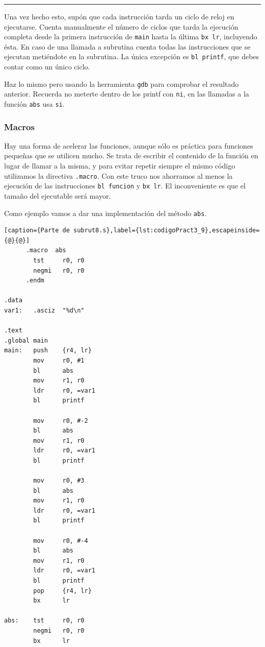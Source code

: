 \begin{center}
\begin{myfbox}
\small
\begin{minipage}{0.92\linewidth}
\begin{center}
\colorbox[gray]{1}{\rule{0cm}{4.5cm}\rule{11cm}{0cm}}
\end{center}
\end{minipage}
\end{myfbox}
\end{center}

Una vez hecho esto, supón que cada instrucción tarda un ciclo de reloj en ejecutarse.
Cuenta manualmente el número de ciclos que tarda la ejecución completa desde la primera
instrucción de {\tt main} hasta la última {\tt bx lr}, incluyendo ésta. En caso de una
llamada a subrutina cuenta todas las instrucciones que se ejecutan metiéndote en la
subrutina. La única excepción es {\tt bl printf}, que debes contar como un único ciclo.

Haz lo mismo pero usando la herramienta {\tt gdb} para comprobar el resultado anterior.
Recuerda no meterte dentro de los printf con {\tt ni}, en las llamadas a la función
{\tt abs} usa {\tt si}.

\subsubsection{Macros}

Hay una forma de acelerar las funciones, aunque sólo es práctica para funciones pequeñas
que se utilicen mucho. Se trata de escribir el contenido de la función en lugar de
llamar a la misma, y para evitar repetir siempre el mismo código utilizamos la directiva
{\tt .macro}. Con este truco nos ahorramos al menos la ejecución de las instrucciones
{\tt bl funcion} y {\tt bx lr}. El inconveniente es que el tamaño del ejecutable será
mayor.

Como ejemplo vamos a dar una implementación del método {\tt abs}.

\begin{lstlisting}[caption={Parte de subrut8.s},label={lst:codigoPract3_9},escapeinside={@}{@}]
      .macro  abs
        tst     r0, r0
        negmi   r0, r0
      .endm

.data
var1:   .asciz  "%d\n"

.text
.global main
main:   push    {r4, lr}
        mov     r0, #1
        bl      abs
        mov     r1, r0
        ldr     r0, =var1
        bl      printf

        mov     r0, #-2
        bl      abs
        mov     r1, r0
        ldr     r0, =var1
        bl      printf

        mov     r0, #3
        bl      abs
        mov     r1, r0
        ldr     r0, =var1
        bl      printf

        mov     r0, #-4
        bl      abs
        mov     r1, r0
        ldr     r0, =var1
        bl      printf
        pop     {r4, lr}
        bx      lr

abs:    tst     r0, r0
        negmi   r0, r0
        bx      lr
\end{lstlisting}

